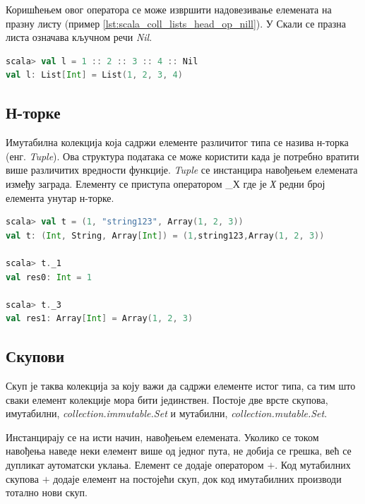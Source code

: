 \documentclass[12pt,oneside]{memoir}
\begin{document}
Коришћењем овог оператора се може извршити надовезивање елемената на празну листу (пример \ref{lst:scala_coll_lists_head_op_nill}). У Скали се празна листа означава кључном речи \textit{Nil}.

\begin{lstlisting}[language=Scala, caption={Додавање елемената на празну листу}, label={lst:scala_coll_lists_head_op_nill}]
scala> val l = 1 :: 2 :: 3 :: 4 :: Nil
val l: List[Int] = List(1, 2, 3, 4)
\end{lstlisting}

\subsection{Н-торке}
\label{subsec:scala_tuple}

Имутабилна колекција која садржи елементе различитог типа се назива н-торка (енг.  \textit{Tuple}). Ова структура података се може користити када је потребно вратити више различитих вредности функције. \textit{Tuple} се инстанцира навођењем елемената између заграда. Елементу се приступа оператором \_Х где је \textit{Х} редни број елемента унутар н-торке. \cite{scala_prog}

\begin{lstlisting}[language=Scala, caption={Н-торка у Скали}, label={lst:scala_coll_tuple_example}]
scala> val t = (1, "string123", Array(1, 2, 3))
val t: (Int, String, Array[Int]) = (1,string123,Array(1, 2, 3))

scala> t._1
val res0: Int = 1

scala> t._3
val res1: Array[Int] = Array(1, 2, 3)
\end{lstlisting}

\subsection{Скупови}
\label{subsec:scala_sets}

Скуп је таква колекција за коју важи да садржи елементе истог типа, са тим што сваки елемент колекције мора бити јединствен. Постоје две врсте скупова, имутабилни, \textit{collection.immutable.Set} и мутабилни, \textit{collection.mutable.Set}.

Инстанцирају се на исти начин, навођењем елемената. Уколико се током навођења наведе неки елемент више од једног пута, не добија се грешка, већ се дупликат аутоматски уклања. Елемент се додаје оператором $+$. Код мутабилних скупова $+$ додаје елемент на постојећи скуп, док код имутабилних производи тотално нови скуп. \cite{scala_prog}
\end{document}
